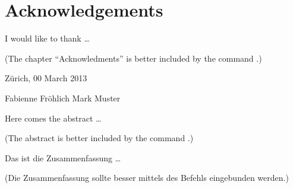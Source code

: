 \documentclass[11pt,a4paper,twoside]{report}
\begin{document}
\cleardoublepage

\chapter*{Acknowledgements}
I would like to thank \ldots

(The chapter ``Acknowledments'' is better included by the command
\verb||.)

\vspace{11mm}
\noindent
Zürich, 00 March 2013

\vspace{19mm}
\noindent
Fabienne Fröhlich \hfill Mark Muster \hfill \null
\cleardoublepage

\thispagestyle{empty}
\begin{center} \huge \bfseries \abstractname \end{center}
Here comes the abstract \ldots

(The abstract is better included by the command \verb||.)
\clearpage

\thispagestyle{empty}
\begin{otherlanguage}{ngerman}
  \begin{center} \huge \bfseries \abstractname \end{center}
  Das ist die Zusammenfassung \ldots
  
  (Die Zusammenfassung sollte besser mittels des Befehls \verb||
  eingebunden werden.)
\end{otherlanguage}
\cleardoublepage

\pagestyle{fancy}
\renewcommand{\chaptermark}[1]{\markboth{#1}{}}
\renewcommand{\sectionmark}[1]{\markright{\thesection\ #1}}
\fancyhead{}

\fancyhead[LO]{\scshape \contentsname}
\fancyhead[RE]{\scshape \contentsname}
\tableofcontents
\clearpage

\fancyhead[LO]{\scshape \listfigurename}
\fancyhead[RE]{\scshape \listfigurename}
\listoffigures
\clearpage

\fancyhead[LO]{\scshape \listtablename}
\fancyhead[RE]{\scshape \listtablename}
\listoftables
\cleardoublepage
\end{document}
